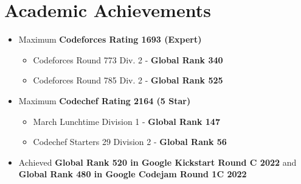 \documentclass[]{ishaan-kamra-resume}
\begin{document}
\begin{minipage}[t]{0.66\textwidth}
    \section{Academic Achievements}
    \begin{itemize}
        \item Maximum \textbf{Codeforces Rating 1693 (Expert)}
              \begin{itemize}
                  \item Codeforces Round 773 Div. 2 - \textbf{Global Rank 340}
                  \item Codeforces Round 785 Div. 2 - \textbf{Global Rank 525}
              \end{itemize}
        \item Maximum \textbf{Codechef Rating 2164 (5 Star)}
              \begin{itemize}
                  \item March Lunchtime Division 1 - \textbf{Global Rank 147}
                  \item Codechef Starters 29 Division 2 - \textbf{Global Rank 56}
              \end{itemize}
        \item Achieved \textbf{Global Rank 520 in Google Kickstart Round C 2022} and \textbf{Global Rank 480 in Google Codejam Round 1C 2022}
    \end{itemize}
    \sectionsep

\end{minipage}
\end{document}
